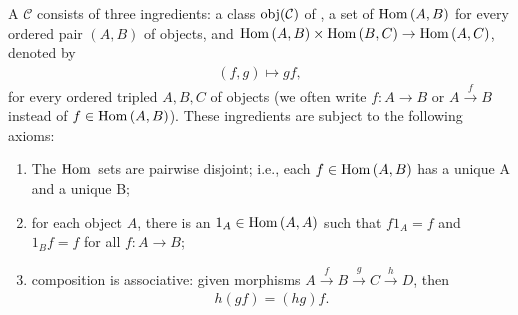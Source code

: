     \begin{definition}\label{def:categories}
        A  $\mathcal{C}$ consists of three ingredients: a class $\operatorname{obj}({\mathcal{C})}$ of , a set of  $\operatorname{Hom}{(A,B)}$ for every ordered pair $(A,B)$ of objects, and  $\operatorname{Hom}{(A,B)} \times \operatorname{Hom}{(B,C)} \rightarrow \operatorname{Hom}{(A,C)}$, denoted by
            \begin{equation*}
            \begin{split}
                (f,g) \mapsto gf,
            \end{split}
            \end{equation*}
        for every ordered tripled $A,B,C$ of objects (we often write $f:A \rightarrow B$ or $A \xrightarrow{f} B$ instead of $f \in \operatorname{Hom}{(A,B)}$). These ingredients are subject to the following axioms:
            \begin{enumerate}[label = (\arabic*)]
                \item The $\operatorname{Hom}{}$ sets are pairwise disjoint; i.e., each $f \in \operatorname{Hom}{(A,B)}$ has a unique  A and a unique  B;
                \item for each object $A$, there is an  $1_A \in \operatorname{Hom}{(A,A)}$ such that $f 1_A = f$ and $1_B f = f$ for all $f: A \rightarrow B$;
                \item composition is associative: given morphisms $A \xrightarrow{f} B \xrightarrow{g} C \xrightarrow{h} D$, then 
                    \begin{equation*}
                    \begin{split}
                        h(gf)=(hg)f.
                    \end{split}
                    \end{equation*}
            \end{enumerate}
    \end{definition}

